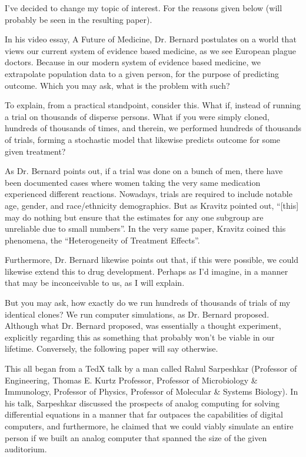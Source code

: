 
I've decided to change my topic of interest. For the reasons given below (will probably be seen in the resulting paper).

In his video essay, A Future of Medicine, Dr. Bernard postulates on a world that views our current system of evidence based medicine, as we see European plague doctors. Because in our modern system of evidence based medicine, we extrapolate population data to a given person, for the purpose of predicting outcome. Which you may ask, what is the problem with such? 

To explain, from a practical standpoint, consider this. What if, instead of running a trial on thousands of disperse persons. What if you were simply cloned, hundreds of thousands of times, and therein, we performed hundreds of thousands of trials, forming a stochastic model that likewise predicts outcome for some given treatment?

As Dr. Bernard points out, if a trial was done on a bunch of men, there have been documented cases where women taking the very same medication experienced different reactions. Nowadays, trials are required to include notable age, gender, and race/ethnicity demographics. But as Kravitz pointed out, ``[this] may do nothing but ensure that the estimates for any one subgroup are unreliable due to small numbers''. In the very same paper, Kravitz coined this phenomena, the ``Heterogeneity of Treatment Effects''. 

Furthermore, Dr. Bernard likewise points out that, if this were possible, we could likewise extend this to drug development. Perhaps as I'd imagine, in a manner that may be inconceivable to us, as I will explain.

But you may ask, how exactly do we run hundreds of thousands of trials of my identical clones? We run computer simulations, as Dr. Bernard proposed. Although what Dr. Bernard proposed, was essentially a thought experiment, explicitly regarding this as something that probably won't be viable in our lifetime. Conversely, the following paper will say otherwise. 

This all began from a TedX talk by a man called Rahul Sarpeshkar (Professor of Engineering, Thomas E. Kurtz Professor, Professor of Microbiology \& Immunology, Professor of Physics, Professor of Molecular \& Systems Biology). In his talk, Sarpeshkar discussed the prospects of analog computing for solving differential equations in a manner that far outpaces the capabilities of digital computers, and furthermore, he claimed that we could viably simulate an entire person if we built an analog computer that spanned the size of the given auditorium.

